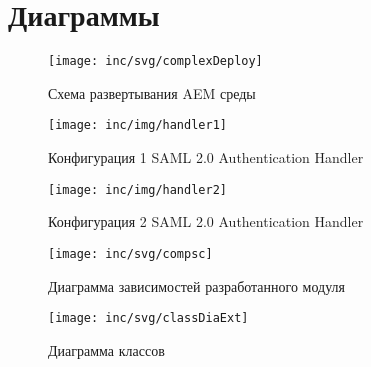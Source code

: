 \chapter{Диаграммы}
\label{cha:appendix1}

\begin{figure}
  \centering
  \texttt{[image: inc/svg/complexDeploy]}
  \caption{Схема развертывания AEM среды}
  \label{fig:complexDeploy}
\end{figure}

\begin{figure}
  \centering
  \texttt{[image: inc/img/handler1]}
  \caption{Конфигурация 1 SAML 2.0 Authentication Handler}
  \label{fig:defaultHandlerConfig1}
\end{figure}

\begin{figure}
  \centering
  \texttt{[image: inc/img/handler2]}
  \caption{Конфигурация 2 SAML 2.0 Authentication Handler}
  \label{fig:defaultHandlerConfig2}
\end{figure}

\begin{figure}
  \centering
  \texttt{[image: inc/svg/compsc]}
  \caption{Диаграмма зависимостей разработанного модуля}
  \label{fig:comps}
\end{figure}

\begin{figure}
  \centering
  \texttt{[image: inc/svg/classDiaExt]}
  \caption{Диаграмма классов}
  \label{fig:classDia}
\end{figure}


